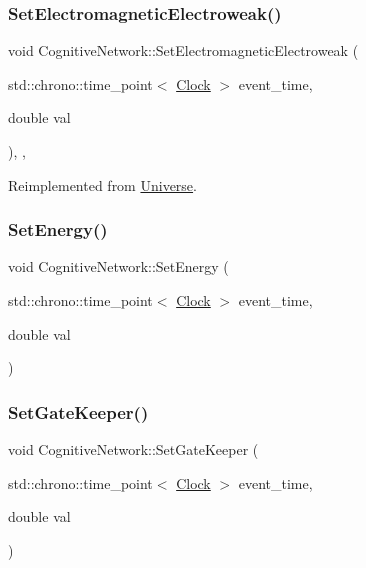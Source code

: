 \subsubsection{\texorpdfstring{Set\+Electromagnetic\+Electroweak()}{SetElectromagneticElectroweak()}}
{\footnotesize\ttfamily void Cognitive\+Network\+::\+Set\+Electromagnetic\+Electroweak (\begin{DoxyParamCaption}\item[{std\+::chrono\+::time\+\_\+point$<$ \mbox{\hyperlink{universe_8h_a0ef8d951d1ca5ab3cfaf7ab4c7a6fd80}{Clock}} $>$}]{event\+\_\+time,  }\item[{double}]{val }\end{DoxyParamCaption})\hspace{0.3cm}{\ttfamily [inline]}, {\ttfamily [final]}, {\ttfamily [virtual]}}



Reimplemented from \mbox{\hyperlink{classUniverse_a608aa95698380f791a0ffba45cc1bee3}{Universe}}.

\mbox{\label{classCognitiveNetwork_af2f96107858445a0b7be2be6af5b5c01}} 
\subsubsection{\texorpdfstring{Set\+Energy()}{SetEnergy()}}
{\footnotesize\ttfamily void Cognitive\+Network\+::\+Set\+Energy (\begin{DoxyParamCaption}\item[{std\+::chrono\+::time\+\_\+point$<$ \mbox{\hyperlink{universe_8h_a0ef8d951d1ca5ab3cfaf7ab4c7a6fd80}{Clock}} $>$}]{event\+\_\+time,  }\item[{double}]{val }\end{DoxyParamCaption})\hspace{0.3cm}{\ttfamily [inline]}}

\mbox{\label{classCognitiveNetwork_a83bc4047721417212fa1bbbfa64da5ee}} 
\subsubsection{\texorpdfstring{Set\+Gate\+Keeper()}{SetGateKeeper()}}
{\footnotesize\ttfamily void Cognitive\+Network\+::\+Set\+Gate\+Keeper (\begin{DoxyParamCaption}\item[{std\+::chrono\+::time\+\_\+point$<$ \mbox{\hyperlink{universe_8h_a0ef8d951d1ca5ab3cfaf7ab4c7a6fd80}{Clock}} $>$}]{event\+\_\+time,  }\item[{double}]{val }\end{DoxyParamCaption})\hspace{0.3cm}{\ttfamily [inline]}}

